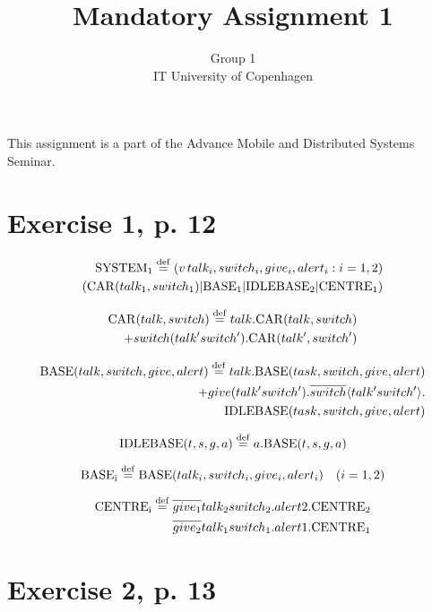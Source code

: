 \documentclass[11pt]{article}
\begin{document}
\title{Mandatory Assignment 1}
\author{Group 1\\
IT University of Copenhagen}
\renewcommand{\today}{September 22, 2012}
\maketitle
This assignment is a part of the Advance Mobile and Distributed Systems Seminar.

\section {Exercise 1, p. 12}

\begin{equation}
\begin{split}
{\rm SYSTEM_1} \stackrel{\mathrm{def}}{=} (v\,talk_i , switch_i , give_i , alert_i : i = 1,2) \\
({\rm CAR}(talk_1 , switch_1) | {\rm BASE_1} | {\rm IDLEBASE_2} | {\rm CENTRE_1})
\end{split}
\end{equation}

\begin{equation}
\begin{split}
{\rm CAR}(talk, switch) \stackrel{\rm def}{=} talk . {\rm CAR}(talk, switch) \\
+ switch(talk' switch') . {\rm CAR}(talk', switch')\\
\end{split}
\end{equation}

\begin{equation}
\begin{split}
{\rm BASE}(talk, switch, give, alert) \stackrel{\rm def}{=} talk . {\rm BASE}(task, switch, give, alert) \\
+ give(talk' switch') . \overline{switch} \langle talk' switch' \rangle . \\
{\rm IDLEBASE}(task, switch, give, alert)
\end{split}
\end{equation}

\begin{equation}
{\rm IDLEBASE}(t, s, g, a) \stackrel{\mathrm{def}}{=} a.{\rm BASE}(t,s,g,a)
\end{equation}

\begin{equation}
{\rm BASE_i} \stackrel{\mathrm{def}}{=} {\rm BASE}(talk_i , switch_i , give_i , alert_i) \quad (i=1,2)
\end{equation}

\begin{equation}
\begin{split}
{\rm CENTRE_i} \stackrel{\mathrm{def}}{=} \overline{give_1}talk_2switch_2.alert2.{\rm CENTRE_2} \\ 
\overline{give_2}talk_1switch_1.alert1.{\rm CENTRE_1}
\end{split}
\end{equation}


\section{Exercise 2, p. 13}

\end{document}
